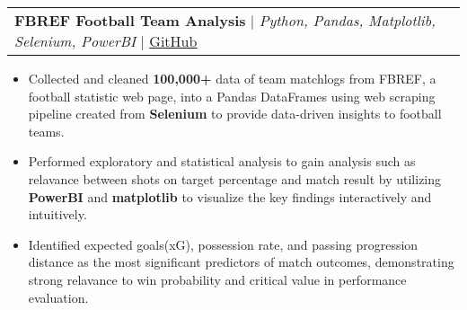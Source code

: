 \documentclass[letterpaper,11pt]{article}
\makeatletter
\newcommand{\resumeItem}[1]{
  \item\small{
    {#1 \vspace{-2pt}}
  }
}
\newcommand{\resumeProjectHeading}[2]{
    \item
    \begin{tabular*}{0.97\textwidth}{l@{\extracolsep{\fill}}r}
      \small#1 & #2 \\
    \end{tabular*}\vspace{-7pt}
}
\newcommand{\resumeItemListStart}{\begin{itemize}}
\newcommand{\resumeItemListEnd}{\end{itemize}\vspace{-5pt}}
\makeatother
\begin{document}
    \resumeProjectHeading      
      {{\textbf{FBREF Football Team Analysis}} $|$ \emph{Python, Pandas, Matplotlib, Selenium, PowerBI} $|$ \href{https://github.com/1128alex/transfermarkt_analysis}{\underline{GitHub}}}{}
      \resumeItemListStart
         \resumeItem{Collected and cleaned \textbf{100,000+} data of team matchlogs from FBREF, a football statistic web page, into a Pandas DataFrames using web scraping pipeline created from \textbf{Selenium} to provide data-driven insights to football teams.}
         \resumeItem{Performed exploratory and statistical analysis to gain analysis such as relavance between shots on target percentage and match result by utilizing \textbf{PowerBI} and \textbf{matplotlib} to visualize the key findings interactively and intuitively.}
          \resumeItem{Identified expected goals(xG), possession rate, and passing progression distance as the most significant predictors of match outcomes, demonstrating strong relavance to win probability and critical value in performance evaluation.} 
        \resumeItemListEnd
    
  
\end{document}

